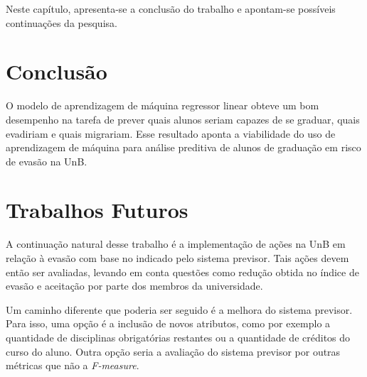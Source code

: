 Neste capítulo, apresenta-se a conclusão do trabalho e apontam-se possíveis continuações da
pesquisa. 

\section{Conclusão}
O modelo de aprendizagem de máquina regressor linear obteve um bom desempenho na
tarefa de prever quais alunos seriam capazes de se graduar, quais evadiriam e quais
migrariam. Esse resultado aponta a viabilidade do uso de
aprendizagem de máquina para análise preditiva de alunos de graduação em risco de
evasão na UnB. 

\section{Trabalhos Futuros}
A continuação natural desse trabalho é a implementação de ações na UnB em
relação à evasão com base no indicado pelo sistema previsor. Tais ações devem então
ser avaliadas, levando em conta questões como redução obtida no índice de evasão 
e aceitação por parte dos membros da universidade. 
\par Um caminho diferente que poderia ser seguido é a melhora do sistema previsor.
Para isso, uma opção é a inclusão de novos atributos, como por exemplo a quantidade
de disciplinas obrigatórias restantes ou a quantidade de créditos do curso do aluno.
Outra opção seria a avaliação do sistema previsor por outras métricas que não a
\textit{F-measure}.  

%
